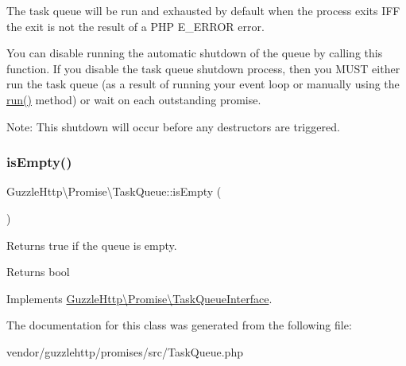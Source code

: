 The task queue will be run and exhausted by default when the process exits I\+FF the exit is not the result of a P\+HP E\+\_\+\+E\+R\+R\+OR error.

You can disable running the automatic shutdown of the queue by calling this function. If you disable the task queue shutdown process, then you M\+U\+ST either run the task queue (as a result of running your event loop or manually using the \hyperlink{interfaceGuzzleHttp_1_1Promise_1_1TaskQueueInterface_a237b20becf9d317b6092a8bc04ab27fc}{run()} method) or wait on each outstanding promise.

Note\+: This shutdown will occur before any destructors are triggered. \mbox{\label{classGuzzleHttp_1_1Promise_1_1TaskQueue_a4589829e74091b66d7b6aba06e6d38b8}} 
\subsubsection{\texorpdfstring{is\+Empty()}{isEmpty()}}
{\footnotesize\ttfamily Guzzle\+Http\textbackslash{}\+Promise\textbackslash{}\+Task\+Queue\+::is\+Empty (\begin{DoxyParamCaption}{ }\end{DoxyParamCaption})}

Returns true if the queue is empty.

\begin{DoxyReturn}{Returns}
bool 
\end{DoxyReturn}


Implements \hyperlink{interfaceGuzzleHttp_1_1Promise_1_1TaskQueueInterface_ac979f0b2e52a8ef6d9fc3cc751873d7b}{Guzzle\+Http\textbackslash{}\+Promise\textbackslash{}\+Task\+Queue\+Interface}.



The documentation for this class was generated from the following file\+:\begin{DoxyCompactItemize}
\item 
vendor/guzzlehttp/promises/src/Task\+Queue.\+php\end{DoxyCompactItemize}
